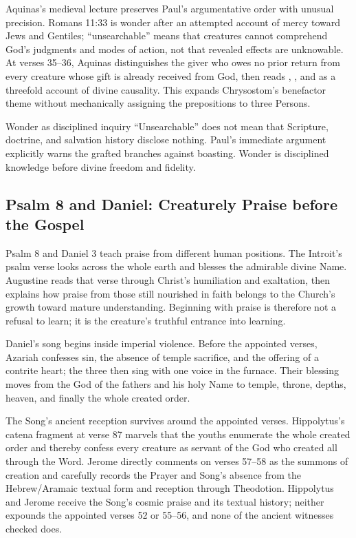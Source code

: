 Aquinas's medieval lecture preserves Paul's argumentative order with unusual precision. Romans 11:33 is wonder after an attempted account of mercy toward Jews and Gentiles; ``unsearchable'' means that creatures cannot comprehend God's judgments and modes of action, not that revealed effects are unknowable. At verses 35--36, Aquinas distinguishes the giver who owes no prior return from every creature whose gift is already received from God, then reads , , and  as a threefold account of divine causality. This expands Chrysostom's benefactor theme without mechanically assigning the prepositions to three Persons.

\begin{studybox}{Wonder as disciplined inquiry}
``Unsearchable'' does not mean that Scripture, doctrine, and salvation history disclose nothing. Paul's immediate argument explicitly warns the grafted branches against boasting. Wonder is disciplined knowledge before divine freedom and fidelity.
\end{studybox}

\sectionguard
\subsection*{Psalm 8 and Daniel: Creaturely Praise before the Gospel\enspace{}}

Psalm 8 and Daniel 3 teach praise from different human positions. The Introit's psalm verse looks across the whole earth and blesses the admirable divine Name. Augustine reads that verse through Christ's humiliation and exaltation, then explains how praise from those still nourished in faith belongs to the Church's growth toward mature understanding. Beginning with praise is therefore not a refusal to learn; it is the creature's truthful entrance into learning.

Daniel's song begins inside imperial violence. Before the appointed verses, Azariah confesses sin, the absence of temple sacrifice, and the offering of a contrite heart; the three then sing with one voice in the furnace. Their blessing moves from the God of the fathers and his holy Name to temple, throne, depths, heaven, and finally the whole created order.

The Song's ancient reception survives around the appointed verses. Hippolytus's catena fragment at verse 87 marvels that the youths enumerate the whole created order and thereby confess every creature as servant of the God who created all through the Word. Jerome directly comments on verses 57--58 as the summons of creation and carefully records the Prayer and Song's absence from the Hebrew/Aramaic textual form and reception through Theodotion. Hippolytus and Jerome receive the Song's cosmic praise and its textual history; neither expounds the appointed verses 52 or 55--56, and none of the ancient witnesses checked does.

